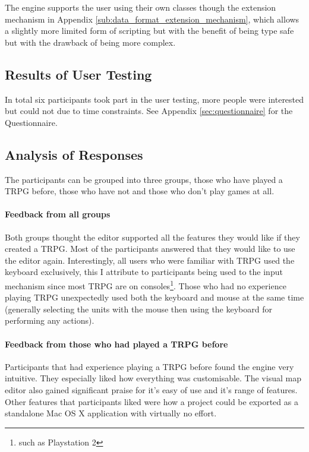 The engine supports the user using their own classes though the extension mechanism in Appendix \ref{sub:data_format_extension_mechanism}, which allows a slightly more limited form of scripting but with the benefit of being type safe but with the drawback of being  more complex.

% 

\subsection{Results of User Testing}
In total six participants took part in the user testing, more people were interested but could not due to time constraints.  See Appendix \ref{sec:questionnaire} for the Questionnaire.

\subsection{Analysis of Responses}
The participants can be grouped into three groups, those who have played a TRPG before, those who have not and those who don't play games at all.
\paragraph{Feedback from  all groups\\}
Both groups thought the editor supported all the features they would like if they created a TRPG.  Most of the participants answered that they would like to use the editor again.  Interestingly, all users who were familiar with TRPG used the keyboard exclusively, this I attribute to participants being used to the input mechanism since most TRPG are on consoles\footnote{such as Playstation 2}. Those who had no experience playing TRPG unexpectedly used both the keyboard and mouse at the same time (generally selecting the units with the mouse then using the keyboard for performing any actions).

\paragraph{Feedback from those who had played a TRPG before\\}
Participants that had experience playing a TRPG before found the engine very intuitive. They especially liked how everything was customisable.  The visual map editor also gained significant praise for it's easy of use and it's range of features.  Other features that participants liked were how a project could be exported as a standalone Mac OS X application with virtually no effort. 

